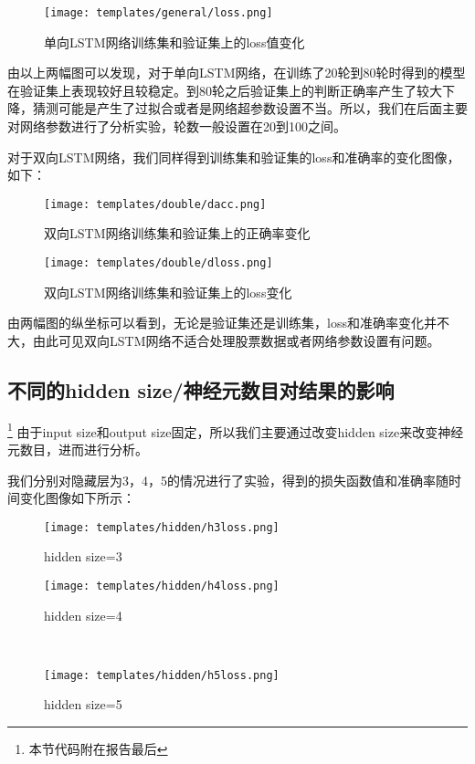 \documentclass[addpoints,answers]{exam}
\begin{document}
\begin{figure}[H] %
\centering %
\texttt{[image: templates/general/loss.png]} %
\caption{单向LSTM网络训练集和验证集上的loss值变化} %
\label{Fig.main4} %
\end{figure}
由以上两幅图可以发现，对于单向LSTM网络，在训练了20轮到80轮时得到的模型在验证集上表现较好且较稳定。到80轮之后验证集上的判断正确率产生了较大下降，猜测可能是产生了过拟合或者是网络超参数设置不当。所以，我们在后面主要对网络参数进行了分析实验，轮数一般设置在20到100之间。

对于双向LSTM网络，我们同样得到训练集和验证集的loss和准确率的变化图像，如下：

\begin{figure}[H]
\centering
\begin{minipage}[t]{0.48\textwidth}
\centering
\texttt{[image: templates/double/dacc.png]}
\caption{双向LSTM网络训练集和验证集上的正确率变化}
\end{minipage}
\begin{minipage}[t]{0.48\textwidth}
\centering
\texttt{[image: templates/double/dloss.png]}
\caption{双向LSTM网络训练集和验证集上的loss变化}
\end{minipage}
\end{figure}

由两幅图的纵坐标可以看到，无论是验证集还是训练集，loss和准确率变化并不大，由此可见双向LSTM网络不适合处理股票数据或者网络参数设置有问题。

%




\subsection{不同的hidden size/神经元数目对结果的影响}\footnote{本节代码附在报告最后}
由于input size和output size固定，所以我们主要通过改变hidden size来改变神经元数目，进而进行分析。

我们分别对隐藏层为3，4，5的情况进行了实验，得到的损失函数值和准确率随时间变化图像如下所示：
\begin{figure}[H]
\centering
\begin{minipage}[t]{0.48\textwidth}
\centering
\texttt{[image: templates/hidden/h3loss.png]}
\caption{hidden size=3}
\end{minipage}
\begin{minipage}[t]{0.48\textwidth}
\centering
\texttt{[image: templates/hidden/h4loss.png]}
\caption{hidden size=4}
\end{minipage}\\
\begin{minipage}[t]{0.48\textwidth}
\centering
\texttt{[image: templates/hidden/h5loss.png]}
\caption{hidden size=5}
\end{minipage}
\end{figure}
\end{document}
